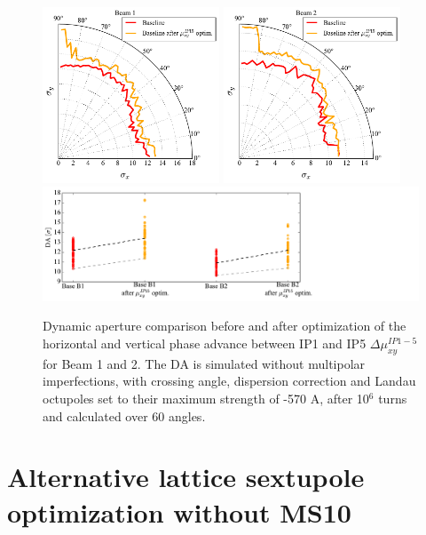 \documentclass{cernatsnote}
\begin{document}
\begin{figure}[h!]
\centering
\includegraphics[width=0.47\textwidth]{images/da_polar_base_optim_b1.pdf} \hfill \includegraphics[width=0.47\textwidth]{images/da_polar_base_optim_b2.pdf}
\hbox{\hspace{1.0cm}\includegraphics[width=1.2\textwidth]{images/da_noimp_base_b12.pdf}} 
\caption{\label{da_base} Dynamic aperture comparison before and after optimization of the horizontal and vertical phase advance between IP1 and IP5 $\Delta\mu_{xy}^{IP1-5}$ for Beam 1 and 2. The DA is simulated without multipolar imperfections, with crossing angle, dispersion correction and Landau octupoles set to their maximum strength of -570 A, after 10$^{6}$ turns and calculated over 60 angles. }
\end{figure}

\clearpage

\section{Alternative lattice sextupole optimization without MS10} \label{alternative}
\end{document}
